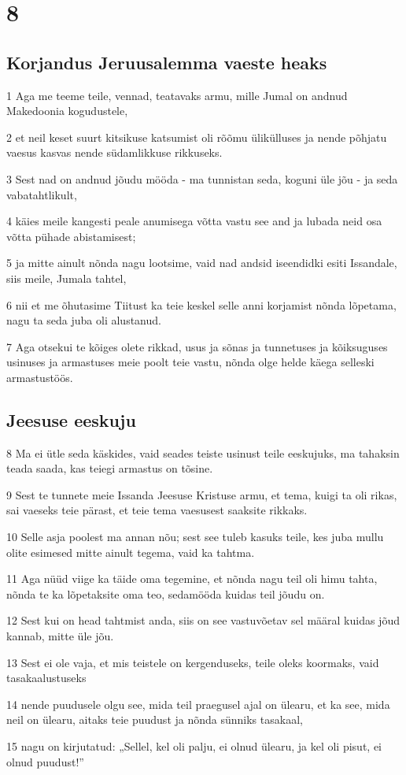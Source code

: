 \chapter{8}

\section*{Korjandus Jeruusalemma vaeste heaks}

\par 1 Aga me teeme teile, vennad, teatavaks armu, mille Jumal on andnud Makedoonia kogudustele,
\par 2 et neil keset suurt kitsikuse katsumist oli rõõmu ülikülluses ja nende põhjatu vaesus kasvas nende südamlikkuse rikkuseks.
\par 3 Sest nad on andnud jõudu mööda - ma tunnistan seda, koguni üle jõu - ja seda vabatahtlikult,
\par 4 käies meile kangesti peale anumisega võtta vastu see and ja lubada neid osa võtta pühade abistamisest;
\par 5 ja mitte ainult nõnda nagu lootsime, vaid nad andsid iseendidki esiti Issandale, siis meile, Jumala tahtel,
\par 6 nii et me õhutasime Tiitust ka teie keskel selle anni korjamist nõnda lõpetama, nagu ta seda juba oli alustanud.
\par 7 Aga otsekui te kõiges olete rikkad, usus ja sõnas ja tunnetuses ja kõiksuguses usinuses ja armastuses meie poolt teie vastu, nõnda olge helde käega selleski armastustöös.

\section*{Jeesuse eeskuju}

\par 8 Ma ei ütle seda käskides, vaid seades teiste usinust teile eeskujuks, ma tahaksin teada saada, kas teiegi armastus on tõsine.
\par 9 Sest te tunnete meie Issanda Jeesuse Kristuse armu, et tema, kuigi ta oli rikas, sai vaeseks teie pärast, et teie tema vaesusest saaksite rikkaks.
\par 10 Selle asja poolest ma annan nõu; sest see tuleb kasuks teile, kes juba mullu olite esimesed mitte ainult tegema, vaid ka tahtma.
\par 11 Aga nüüd viige ka täide oma tegemine, et nõnda nagu teil oli himu tahta, nõnda te ka lõpetaksite oma teo, sedamööda kuidas teil jõudu on.
\par 12 Sest kui on head tahtmist anda, siis on see vastuvõetav sel määral kuidas jõud kannab, mitte üle jõu.
\par 13 Sest ei ole vaja, et mis teistele on kergenduseks, teile oleks koormaks, vaid tasakaalustuseks
\par 14 nende puudusele olgu see, mida teil praegusel ajal on ülearu, et ka see, mida neil on ülearu, aitaks teie puudust ja nõnda sünniks tasakaal,
\par 15 nagu on kirjutatud: „Sellel, kel oli palju, ei olnud ülearu, ja kel oli pisut, ei olnud puudust!”

